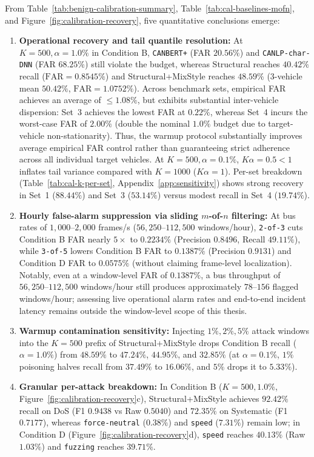 \documentclass[12pt, a4paper, reqno, oneside]{book}
\DeclareRobustCommand{\code}[1]{\nolinkurl{#1}}
\begin{document}
From Table~\ref{tab:benign-calibration-summary}, Table~\ref{tab:cal-baselines-mofn}, and Figure~\ref{fig:calibration-recovery}, five quantitative conclusions emerge:
\begin{enumerate}
    \item \textbf{Operational recovery and tail quantile resolution:} At $K=500, \alpha=1.0\%$ in Condition B, \code{CANBERT+} (FAR $20.56\%$) and \code{CANLP-char-DNN} (FAR $68.25\%$) still violate the budget, whereas Structural reaches $40.42\%$ recall ($\text{FAR}=0.8545\%$) and Structural+MixStyle reaches $48.59\%$ (3-vehicle mean $50.42\%$, $\text{FAR}=1.0752\%$). Across benchmark sets, empirical FAR achieves an average of $\le 1.08\%$, but exhibits substantial inter-vehicle dispersion: Set~3 achieves the lowest FAR at $0.22\%$, whereas Set~4 incurs the worst-case FAR of $2.00\%$ (double the nominal $1.0\%$ budget due to target-vehicle non-stationarity). Thus, the warmup protocol substantially improves average empirical FAR control rather than guaranteeing strict adherence across all individual target vehicles. At $K=500, \alpha=0.1\%$, $K\alpha = 0.5 < 1$ inflates tail variance compared with $K=1000$ ($K\alpha = 1$). Per-set breakdown (Table~\ref{tab:cal-k-per-set}, Appendix~\ref{app:sensitivity}) shows strong recovery in Set~1 ($88.44\%$) and Set~3 ($53.14\%$) versus modest recall in Set~4 ($19.74\%$).
    \item \textbf{Hourly false-alarm suppression via sliding $m$-of-$n$ filtering:} At bus rates of $1{,}000$--$2{,}000$ frames/s ($56{,}250$--$112{,}500$ windows/hour), \code{2-of-3} cuts Condition B FAR nearly $5\times$ to $0.2234\%$ (Precision $0.8496$, Recall $49.11\%$), while \code{3-of-5} lowers Condition B FAR to $0.1387\%$ (Precision $0.9131$) and Condition D FAR to $0.0575\%$ (without claiming frame-level localization). Notably, even at a window-level FAR of $0.1387\%$, a bus throughput of $56{,}250\text{--}112{,}500$ windows/hour still produces approximately $78\text{--}156$ flagged windows/hour; assessing live operational alarm rates and end-to-end incident latency remains outside the window-level scope of this thesis.
    \item \textbf{Warmup contamination sensitivity:} Injecting $1\%, 2\%, 5\%$ attack windows into the $K=500$ prefix of Structural+MixStyle drops Condition B recall ($\alpha=1.0\%$) from $48.59\%$ to $47.24\%$, $44.95\%$, and $32.85\%$ (at $\alpha=0.1\%$, $1\%$ poisoning halves recall from $37.49\%$ to $16.06\%$, and $5\%$ drops it to $5.33\%$).
    \item \textbf{Granular per-attack breakdown:} In Condition B ($K=500, 1.0\%$, Figure~\ref{fig:calibration-recovery}c), Structural+MixStyle achieves $92.42\%$ recall on DoS (F1 $0.9438$ vs Raw $0.5040$) and $72.35\%$ on Systematic (F1 $0.7177$), whereas \code{force-neutral} ($0.38\%$) and \code{speed} ($7.31\%$) remain low; in Condition D (Figure~\ref{fig:calibration-recovery}d), \code{speed} reaches $40.13\%$ (Raw $1.03\%$) and \code{fuzzing} reaches $39.71\%$.

\end{enumerate}
\end{document}
